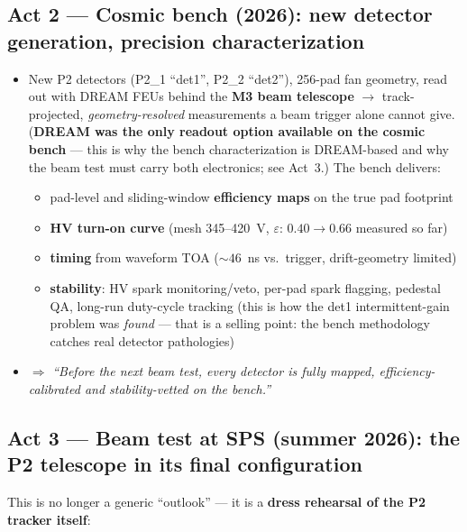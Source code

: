 \documentclass[11pt,a4paper]{article}
\begin{document}
\subsection*{Act 2 --- Cosmic bench (2026): new detector generation, precision characterization}

\begin{itemize}[itemsep=2pt]
  \item New P2 detectors (P2\_1 ``det1'', P2\_2 ``det2''), 256-pad fan
    geometry, read out with DREAM FEUs behind the \textbf{M3 beam telescope}
    $\rightarrow$ track-projected, \emph{geometry-resolved} measurements a beam
    trigger alone cannot give. (\textbf{DREAM was the only readout option
    available on the cosmic bench} --- this is why the bench characterization
    is DREAM-based and why the beam test must carry both electronics; see
    Act~3.) The bench delivers:
    \begin{itemize}
      \item pad-level and sliding-window \textbf{efficiency maps} on the true pad footprint
      \item \textbf{HV turn-on curve} (mesh 345--420~V, $\varepsilon$: $0.40 \rightarrow 0.66$ measured so far)
      \item \textbf{timing} from waveform TOA (${\sim}46$~ns vs.\ trigger, drift-geometry limited)
      \item \textbf{stability}: HV spark monitoring/veto, per-pad spark
        flagging, pedestal QA, long-run duty-cycle tracking (this is how the
        det1 intermittent-gain problem was \emph{found} --- that is a selling
        point: the bench methodology catches real detector pathologies)
    \end{itemize}
  \item $\Rightarrow$ \emph{``Before the next beam test, every detector is fully
    mapped, efficiency-calibrated and stability-vetted on the bench.''}
\end{itemize}

\subsection*{Act 3 --- Beam test at SPS (summer 2026): the P2 telescope in its final configuration}

This is no longer a generic ``outlook'' --- it is a \textbf{dress rehearsal of
the P2 tracker itself}:
\end{document}
